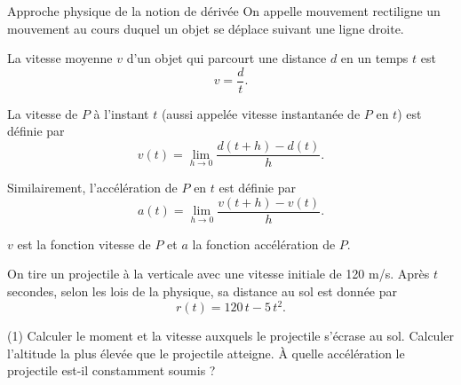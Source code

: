 \documentclass[a4paper,12pt]{article}
\begin{document}
\begin{activite}{Approche physique de la notion de dérivée}
\tcblower
On appelle mouvement rectiligne un mouvement au cours duquel un objet se déplace suivant une ligne droite.

La vitesse moyenne \(v\) d’un objet qui parcourt une distance \(d\) en un temps \(t\) est
\[
  v = \dfrac{d}{t}.
\]

La vitesse de \(P\) à l’instant \(t\) (aussi appelée vitesse instantanée de \(P\) en \(t\)) est définie par
\[
  v(t) = \displaystyle\lim_{h\to 0}\dfrac{d(t+h) - d(t)}{h}.
\]

Similairement, l’accélération de \(P\) en \(t\) est définie par
\[
  a(t) = \displaystyle\lim_{h\to 0}\dfrac{v(t+h) - v(t)}{h}.
\]

\(v\) est la fonction vitesse de \(P\) et \(a\) la fonction accélération de \(P\).

On tire un projectile à la verticale avec une vitesse initiale de 120 m/s. Après \(t\) secondes, selon les lois de la physique, sa distance au sol est donnée par
\[
  r(t) = 120\,t - 5\,t^2.
\]

\begin{tasks}(1)
  \task Calculer le moment et la vitesse auxquels le projectile s’écrase au sol.
  \task Calculer l’altitude la plus élevée que le projectile atteigne.
  \task À quelle accélération le projectile est-il constamment soumis ?
\end{tasks}
\end{activite}
\end{document}
